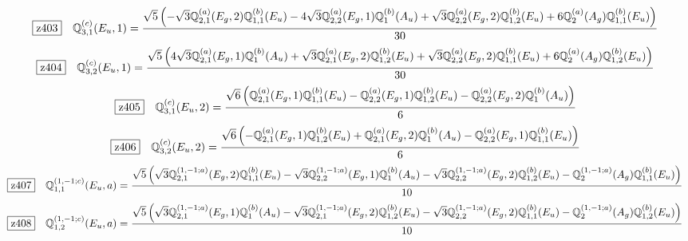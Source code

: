 \documentclass[fleqn,10pt,landscape]{jsarticle}
\begin{document}
\begin{dmath*}
\hspace*{3mm}\fbox{z403}\quad \mathbb{Q}_{3,1}^{(c)}(E_{u},1)=\frac{\sqrt{5} \left(- \sqrt{3} \mathbb{Q}_{2,1}^{(a)}(E_{g},2) \mathbb{Q}_{1,1}^{(b)}(E_{u}) - 4 \sqrt{3} \mathbb{Q}_{2,2}^{(a)}(E_{g},1) \mathbb{Q}_{1}^{(b)}(A_{u}) + \sqrt{3} \mathbb{Q}_{2,2}^{(a)}(E_{g},2) \mathbb{Q}_{1,2}^{(b)}(E_{u}) + 6 \mathbb{Q}_{2}^{(a)}(A_{g}) \mathbb{Q}_{1,1}^{(b)}(E_{u})\right)}{30}
\end{dmath*}
\begin{dmath*}
\hspace*{3mm}\fbox{z404}\quad \mathbb{Q}_{3,2}^{(c)}(E_{u},1)=\frac{\sqrt{5} \left(4 \sqrt{3} \mathbb{Q}_{2,1}^{(a)}(E_{g},1) \mathbb{Q}_{1}^{(b)}(A_{u}) + \sqrt{3} \mathbb{Q}_{2,1}^{(a)}(E_{g},2) \mathbb{Q}_{1,2}^{(b)}(E_{u}) + \sqrt{3} \mathbb{Q}_{2,2}^{(a)}(E_{g},2) \mathbb{Q}_{1,1}^{(b)}(E_{u}) + 6 \mathbb{Q}_{2}^{(a)}(A_{g}) \mathbb{Q}_{1,2}^{(b)}(E_{u})\right)}{30}
\end{dmath*}
\begin{dmath*}
\hspace*{3mm}\fbox{z405}\quad \mathbb{Q}_{3,1}^{(c)}(E_{u},2)=\frac{\sqrt{6} \left(\mathbb{Q}_{2,1}^{(a)}(E_{g},1) \mathbb{Q}_{1,1}^{(b)}(E_{u}) - \mathbb{Q}_{2,2}^{(a)}(E_{g},1) \mathbb{Q}_{1,2}^{(b)}(E_{u}) - \mathbb{Q}_{2,2}^{(a)}(E_{g},2) \mathbb{Q}_{1}^{(b)}(A_{u})\right)}{6}
\end{dmath*}
\begin{dmath*}
\hspace*{3mm}\fbox{z406}\quad \mathbb{Q}_{3,2}^{(c)}(E_{u},2)=\frac{\sqrt{6} \left(- \mathbb{Q}_{2,1}^{(a)}(E_{g},1) \mathbb{Q}_{1,2}^{(b)}(E_{u}) + \mathbb{Q}_{2,1}^{(a)}(E_{g},2) \mathbb{Q}_{1}^{(b)}(A_{u}) - \mathbb{Q}_{2,2}^{(a)}(E_{g},1) \mathbb{Q}_{1,1}^{(b)}(E_{u})\right)}{6}
\end{dmath*}
\begin{dmath*}
\hspace*{3mm}\fbox{z407}\quad \mathbb{Q}_{1,1}^{(1,-1;c)}(E_{u},a)=\frac{\sqrt{5} \left(\sqrt{3} \mathbb{Q}_{2,1}^{(1,-1;a)}(E_{g},2) \mathbb{Q}_{1,1}^{(b)}(E_{u}) - \sqrt{3} \mathbb{Q}_{2,2}^{(1,-1;a)}(E_{g},1) \mathbb{Q}_{1}^{(b)}(A_{u}) - \sqrt{3} \mathbb{Q}_{2,2}^{(1,-1;a)}(E_{g},2) \mathbb{Q}_{1,2}^{(b)}(E_{u}) - \mathbb{Q}_{2}^{(1,-1;a)}(A_{g}) \mathbb{Q}_{1,1}^{(b)}(E_{u})\right)}{10}
\end{dmath*}
\begin{dmath*}
\hspace*{3mm}\fbox{z408}\quad \mathbb{Q}_{1,2}^{(1,-1;c)}(E_{u},a)=\frac{\sqrt{5} \left(\sqrt{3} \mathbb{Q}_{2,1}^{(1,-1;a)}(E_{g},1) \mathbb{Q}_{1}^{(b)}(A_{u}) - \sqrt{3} \mathbb{Q}_{2,1}^{(1,-1;a)}(E_{g},2) \mathbb{Q}_{1,2}^{(b)}(E_{u}) - \sqrt{3} \mathbb{Q}_{2,2}^{(1,-1;a)}(E_{g},2) \mathbb{Q}_{1,1}^{(b)}(E_{u}) - \mathbb{Q}_{2}^{(1,-1;a)}(A_{g}) \mathbb{Q}_{1,2}^{(b)}(E_{u})\right)}{10}
\end{dmath*}
\end{document}
